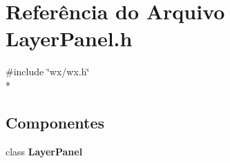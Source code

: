 \section{Referência do Arquivo Layer\+Panel.\+h}
\label{_layer_panel_8h}
{\ttfamily \#include \char`\"{}wx/wx.\+h\char`\"{}}\\*
\subsection*{Componentes}
\begin{DoxyCompactItemize}
\item 
class {\bf Layer\+Panel}
\end{DoxyCompactItemize}
